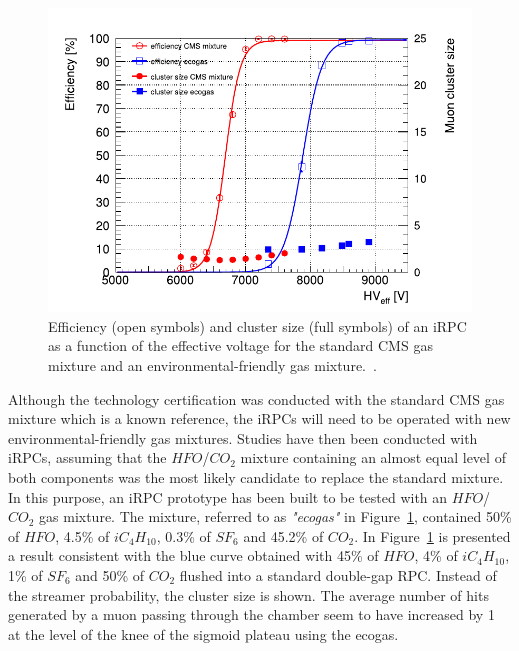 	\begin{figure}
		\centering
		\includegraphics[width=\linewidth]{fig/chapt3/iRPC-HFO-mixture.pdf}
		\caption{\label{fig:iRPC-eco} Efficiency (open symbols) and cluster size (full symbols) of an iRPC as a function of the effective voltage for the standard CMS gas mixture and an environmental-friendly gas mixture.~\cite{PHASEIITP}.}
	\end{figure}
	
	Although the technology certification was conducted with the standard CMS gas mixture which is a known reference, the iRPCs will need to be operated with new environmental-friendly gas mixtures. Studies have then been conducted with iRPCs, assuming that the $HFO$/$CO_2$ mixture containing an almost equal level of both components was the most likely candidate to replace the standard mixture. In this purpose, an iRPC prototype has been built to be tested with an $HFO$/$CO_2$ gas mixture. The mixture, referred to as \textit{"ecogas"} in Figure~\ref{fig:iRPC-eco}, contained 50\% of $HFO$, 4.5\% of $iC_4H_{10}$, 0.3\% of $SF_6$ and 45.2\% of $CO_2$. In Figure~\ref{fig:iRPC-eco} is presented a result consistent with the blue curve obtained with 45\% of $HFO$, 4\% of $iC_4H_{10}$, 1\% of $SF_6$ and 50\% of $CO_2$ flushed into a standard double-gap RPC. Instead of the streamer probability, the cluster size is shown. The average number of hits generated by a muon passing through the chamber seem to have increased by 1 at the level of the knee of the sigmoid plateau using the ecogas.
	
\endgroup

\clearpage{\pagestyle{empty}\cleardoublepage}